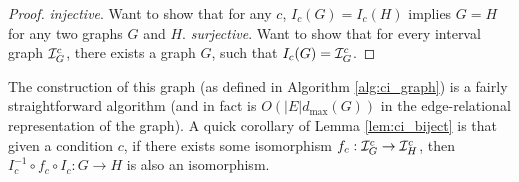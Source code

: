 \begin{proof}
  \textit{injective}. Want to show that for any $c$, $I_c(G) = I_c(H)$ implies $G = H$
  for any two graphs $G$ and $H$.
  \textit{surjective}. Want to show that for every interval graph
  $\mathcal{I}^c_G$, there exists a graph $G$, such that $I_c(G) = \mathcal{I}^c_G$.
\end{proof}

The construction of this graph (as defined in Algorithm
\ref{alg:ci_graph}) is a fairly
straightforward algorithm (and in fact is $O(|E|d_{\max}(G))$ in the
edge-relational representation of the graph). A quick corollary of
Lemma \ref{lem:ci_biject} is that given a condition $c$, if there
exists some isomorphism $f_c : \mathcal{I}^c_G \to \mathcal{I}^c_H$, then $I_c^{-1}
\circ f_c \circ I_c : G \to H$ is also an isomorphism.
